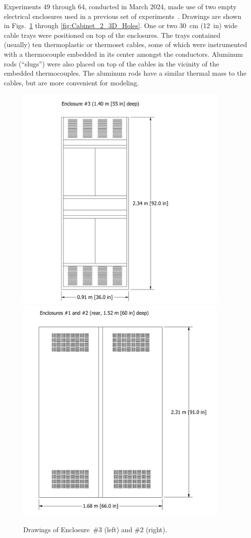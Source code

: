 Experiments 49 through 64, conducted in March 2024, made use of two empty electrical enclosures used in a previous set of experiments~\cite{OLIVE-FIRE}. Drawings are shown in Figs.~\ref{fig:enclosure_drawings} through \ref{fig:Cabinet_2_3D_Holes}. One or two 30~cm (12~in) wide cable trays were positioned on top of the enclosures. The trays contained (usually) ten thermoplastic or thermoset cables, some of which were instrumented with a thermocouple embedded in its center amongst the conductors. Aluminum rods (``slugs'') were also placed on top of the cables in the vicinity of the embedded thermocouples. The aluminum rods have a similar thermal mass to the cables, but are more convenient for modeling.
\begin{figure}[!ht]
\hspace*{-0.75in}\includegraphics[height=4.5in]{../FIGURES/Cabinet_3}
\hspace*{-1.25in}\includegraphics[height=4.5in]{../FIGURES/Cabinet_1}
\caption[Drawings of Enclosures \#2 and \#3]{Drawings of Enclosure~\#3 (left) and \#2 (right).}
\label{fig:enclosure_drawings}
\end{figure}
